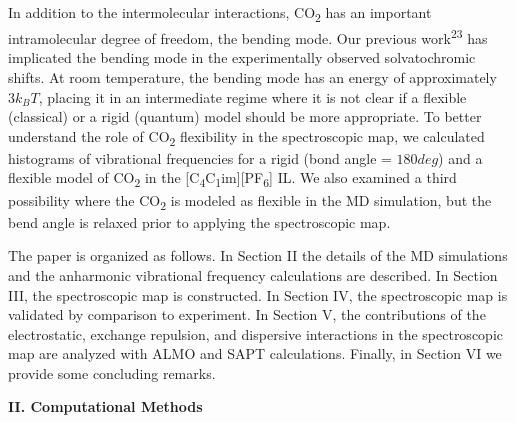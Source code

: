 \documentclass[]{article}
\begin{document}
In addition to the intermolecular interactions, CO\textsubscript{2} has an important intramolecular degree of freedom, the bending mode. Our previous work\textsuperscript{23} has implicated the bending mode in the experimentally observed solvatochromic shifts. At room temperature, the bending mode has an energy of approximately \(3k_{B}T\), placing it in an intermediate regime where it is not clear if a flexible (classical) or a rigid (quantum) model should be more appropriate. To better understand the role of CO\textsubscript{2} flexibility in the spectroscopic map, we calculated histograms of vibrational frequencies for a rigid (bond angle = \(180deg\)) and a flexible model of CO\textsubscript{2} in the {[}C\textsubscript{4}C\textsubscript{1}im{]}{[}PF\textsubscript{6}{]} IL. We also examined a third possibility where the CO\textsubscript{2} is modeled as flexible in the MD simulation, but the bend angle is relaxed prior to applying the spectroscopic map.

The paper is organized as follows. In Section II the details of the MD simulations and the anharmonic vibrational frequency calculations are described. In Section III, the spectroscopic map is constructed. In Section IV, the spectroscopic map is validated by comparison to experiment. In Section V, the contributions of the electrostatic, exchange repulsion, and dispersive interactions in the spectroscopic map are analyzed with ALMO and SAPT calculations. Finally, in Section VI we provide some concluding remarks.

\textbf{II. Computational Methods}
\end{document}
